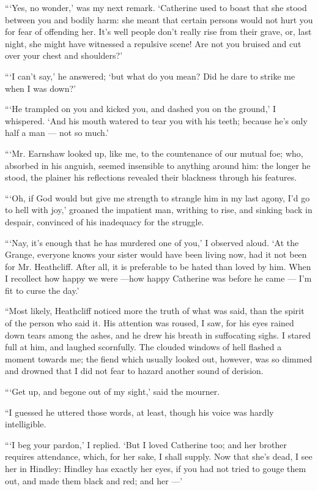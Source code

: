 \par “‘Yes, no wonder,’ was my next remark. ‘Catherine used to boast that she stood between you and bodily harm: she meant that certain persons would not hurt you for fear of offending her. It's well people don't really rise from their grave, or, last night, she might have witnessed a repulsive scene! Are not you bruised and cut over your chest and shoulders?’
\par “‘I can't say,’ he answered; ‘but what do you mean? Did he dare to strike me when I was down?’
\par “‘He trampled on you and kicked you, and dashed you on the ground,’ I whispered. ‘And his mouth watered to tear you with his teeth; because he's only half a man — not so much.’
\par “‘Mr. Earnshaw looked up, like me, to the countenance of our mutual foe; who, absorbed in his anguish, seemed insensible to anything around him: the longer he stood, the plainer his reflections revealed their blackness through his features.
\par “‘Oh, if God would but give me strength to strangle him in my last agony, I'd go to hell with joy,’ groaned the impatient man, writhing to rise, and sinking back in despair, convinced of his inadequacy for the struggle.
\par “‘Nay, it's enough that he has murdered one of you,’ I observed aloud. ‘At the Grange, everyone knows your sister would have been living now, had it not been for Mr. Heathcliff. After all, it is preferable to be hated than loved by him. When I recollect how happy we were —how happy Catherine was before he came — I'm fit to curse the day.’
\par “Most likely, Heathcliff noticed more the truth of what was said, than the spirit of the person who said it. His attention was roused, I saw, for his eyes rained down tears among the ashes, and he drew his breath in suffocating sighs. I stared full at him, and laughed scornfully. The clouded windows of hell flashed a moment towards me; the fiend which usually looked out, however, was so dimmed and drowned that I did not fear to hazard another sound of derision.
\par “‘Get up, and begone out of my sight,’ said the mourner.
\par “I guessed he uttered those words, at least, though his voice was hardly intelligible.
\par “‘I beg your pardon,’ I replied. ‘But I loved Catherine too; and her brother requires attendance, which, for her sake, I shall supply. Now that she's dead, I see her in Hindley: Hindley has exactly her eyes, if you had not tried to gouge them out, and made them black and red; and her —’
